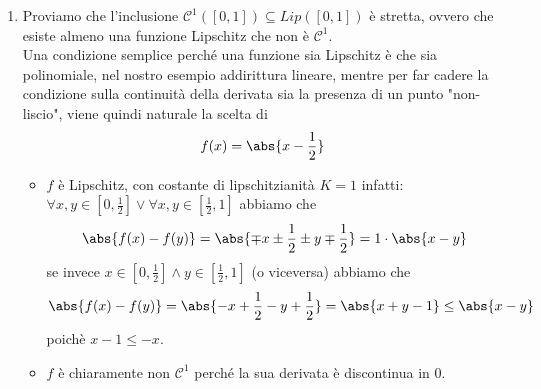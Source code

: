 \begin{enumerate}
 \item Proviamo che l'inclusione $\mathcal{C}^1([0,1])\subseteq Lip([0,1])$ è stretta, ovvero che esiste almeno una funzione Lipschitz che non è $\mathcal{C^1}$.\\
 Una condizione semplice perché una funzione sia Lipschitz è che sia polinomiale, nel nostro esempio addirittura lineare, mentre per far cadere la condizione sulla continuità della derivata sia la presenza di un punto "non-liscio", viene quindi naturale la scelta di $$f(x)=\abs{x-\frac{1}{2}}$$
 \begin{itemize}
     \item $f$ è Lipschitz, con costante di lipschitzianità $K=1$ infatti:\\
     $\forall x,y\in [0,\frac{1}{2}] \lor \forall x,y\in [\frac{1}{2},1]$ abbiamo che
     $$\abs{f(x)-f(y)} = \abs{\mp x\pm \frac{1}{2} \pm y \mp \frac{1}{2}}= 1\cdot \abs{x-y}$$
     se invece $x\in[0,\frac{1}{2}] \land y\in [\frac{1}{2},1]$ (o viceversa) abbiamo che 
     $$\abs{f(x)-f(y)}= \abs{-x+\frac{1}{2}-y+\frac{1}{2}}=\abs{x+y-1}\leq\abs{x-y}$$
     poichè $x-1\leq -x$.
     \item $f$ è chiaramente non $\mathcal{C}^1$ perché la sua derivata è discontinua in 0.
 \end{itemize}
 \begin{center}
 \end{center}
\end{enumerate}




